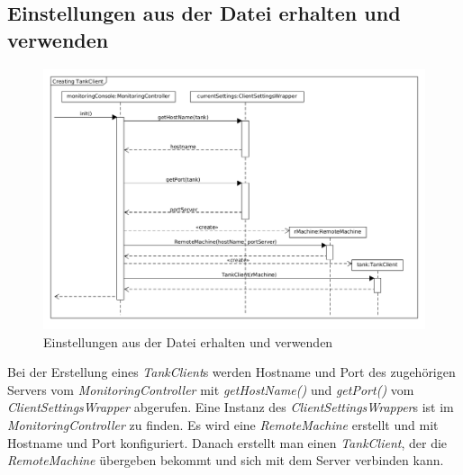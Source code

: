 \documentclass[parskip=full]{scrartcl}
\begin{document}
\subsection{Einstellungen aus der Datei erhalten und verwenden}
\begin{figure}[H]
  \centering
  \includegraphics[scale=0.4]{design/sequence-diagrams/getting-networking-settings.png}
  \caption{Einstellungen aus der Datei erhalten und verwenden}
\end{figure}
Bei der Erstellung eines \emph{TankClient}s werden Hostname und Port des zugehörigen Servers vom \emph{MonitoringController} mit \emph{getHostName()}
und \emph{getPort()} vom \emph{ClientSettingsWrapper} abgerufen. Eine Instanz des \emph{ClientSettingsWrapper}s
ist im \emph{MonitoringController} zu finden. Es wird eine \emph{RemoteMachine} erstellt und mit Hostname und Port konfiguriert.
Danach erstellt man einen \emph{TankClient}, der die \emph{RemoteMachine} übergeben bekommt und sich mit dem Server verbinden kann.
\end{document}
